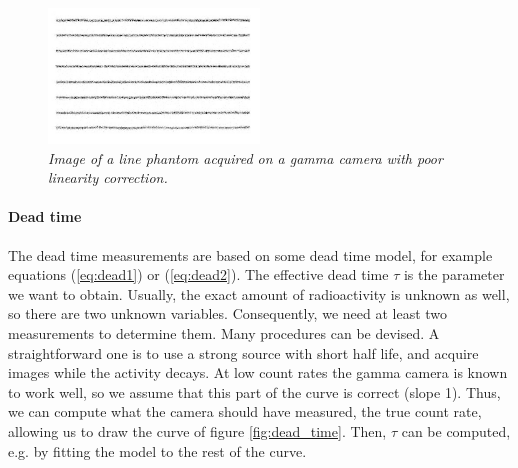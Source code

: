 \documentclass[11pt,oneside]{article}
\begin{document}
\begin{figure}[tb]
\centering
\includegraphics[width=0.5\textwidth]{figs/fig_qc_linearity.pdf}
\caption{\label{fig:qc_linearity} \emph{Image of a line phantom acquired on a
gamma camera with poor linearity correction.}}
\end{figure}

\paragraph{Dead time}
The dead time measurements are based on some dead time model, for example
equations (\ref{eq:dead1}) or (\ref{eq:dead2}). The effective dead time $\tau$
is the parameter we want to obtain. Usually, the exact amount of radioactivity
is unknown as well, so there are two unknown variables. Consequently, we need
at least two measurements to determine them. Many procedures can be devised. A
straightforward one is to use a strong source with short half life, and
acquire images while the activity decays. At low count rates the gamma camera
is known to work well, so we assume that this part of the curve is correct
(slope 1). Thus, we can compute what the camera should have measured, the true
count rate, allowing us to draw the curve of figure \ref{fig:dead_time}. Then,
$\tau$ can be computed, e.g. by fitting the model to the rest of the curve.
\end{document}
